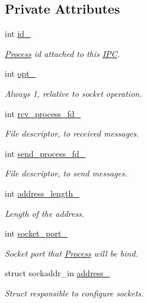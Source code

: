 \subsection*{Private Attributes}
\begin{DoxyCompactItemize}
\item 
int \hyperlink{classdistributed__system_1_1IPC_aafd0c2f55b73e7a1d4bd1174fdebbcf8}{id\+\_\+}
\begin{DoxyCompactList}\small\item\em \hyperlink{classdistributed__system_1_1Process}{Process} id attached to this \hyperlink{classdistributed__system_1_1IPC}{I\+PC}. \end{DoxyCompactList}\item 
int \hyperlink{classdistributed__system_1_1IPC_a7f99d156ebf648d3ff1c3f1db1b84e99}{opt\+\_\+}
\begin{DoxyCompactList}\small\item\em Always 1, relative to socket operation. \end{DoxyCompactList}\item 
int \hyperlink{classdistributed__system_1_1IPC_a92e821fba37e04797ca9ef2c29490e37}{rcv\+\_\+process\+\_\+fd\+\_\+}
\begin{DoxyCompactList}\small\item\em File descriptor, to received messages. \end{DoxyCompactList}\item 
int \hyperlink{classdistributed__system_1_1IPC_acd0d035f1eb6ec4e35eb6adb1a4ebd8c}{send\+\_\+process\+\_\+fd\+\_\+}
\begin{DoxyCompactList}\small\item\em File descriptor, to send messages. \end{DoxyCompactList}\item 
int \hyperlink{classdistributed__system_1_1IPC_ac9d328f95fad3be2cd1b2aa3bfbe0e9d}{address\+\_\+length\+\_\+}
\begin{DoxyCompactList}\small\item\em Length of the address. \end{DoxyCompactList}\item 
int \hyperlink{classdistributed__system_1_1IPC_adffbfa5995d32588eb323ce4c684fae7}{socket\+\_\+port\+\_\+}
\begin{DoxyCompactList}\small\item\em Socket port that \hyperlink{classdistributed__system_1_1Process}{Process} will be bind. \end{DoxyCompactList}\item 
struct sockaddr\+\_\+in \hyperlink{classdistributed__system_1_1IPC_a051ae791ace72a56982febd4267912a0}{address\+\_\+}
\begin{DoxyCompactList}\small\item\em Struct responsible to configure sockets. \end{DoxyCompactList}\end{DoxyCompactItemize}


